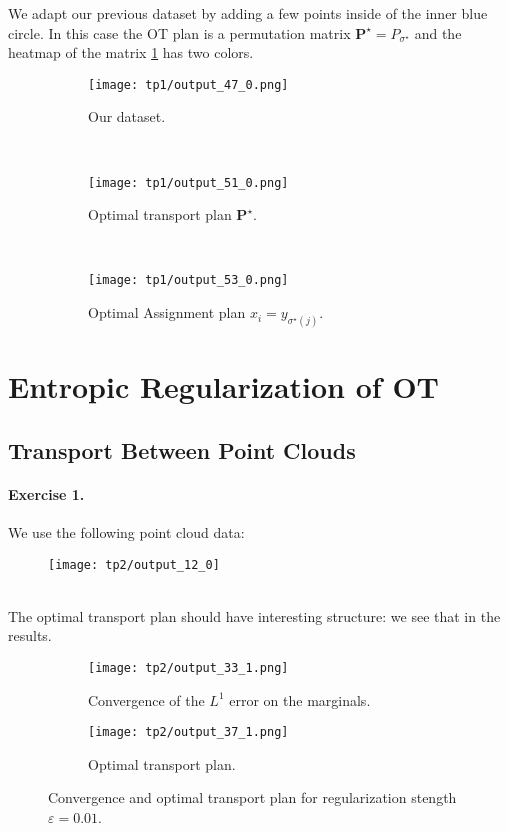 \documentclass{article}
\newcommand{\bfP}{\mathbf{P}}
\renewcommand{\epsilon}{\varepsilon}
\numberwithin{equation}{section}
\theoremstyle{definition}
\begin{document}
We adapt our previous dataset by adding a few points inside of the inner blue circle. In this case the OT plan is a permutation matrix $\bfP^\star = P_{\sigma^\star}$ and the heatmap of the matrix \cref{fig:output510} has two colors.
\begin{figure}[!h]
	\begin{subfigure}[t]{.33\linewidth}
		\texttt{[image: tp1/output\_47\_0.png]}
		\caption{Our dataset.}
	\end{subfigure}~
	\begin{subfigure}[t]{.33\linewidth}
		\texttt{[image: tp1/output\_51\_0.png]}
		\caption{Optimal transport plan $\bfP^\star$.}\label{fig:output510}
	\end{subfigure}~
	\begin{subfigure}[t]{.33\linewidth}
		\texttt{[image: tp1/output\_53\_0.png]}
		\caption{Optimal Assignment plan $x_i = y_{\sigma^\star(j)}$.}\label{fig:output530}
	\end{subfigure}
	\caption{}\label{fig:OptimalAssignment}
\end{figure}


\section{Entropic Regularization of OT}

\subsection{Transport Between Point Clouds}

\paragraph{Exercise 1.} We use the following point cloud data:
\begin{figure}[h!]
	\centering
	\texttt{[image: tp2/output\_12\_0]}
	\caption{}
	\label{fig:output120}
\end{figure}\\
The optimal transport plan should have interesting structure: we see that in the results.
\begin{figure}[!h]
	\centering
	\begin{subfigure}{.49\linewidth}
		\centering
		\texttt{[image: tp2/output\_33\_1.png]}\caption{Convergence of the $L^1$ error on the marginals.}
	\end{subfigure}
	\begin{subfigure}{.49\linewidth}
		\centering
		\texttt{[image: tp2/output\_37\_1.png]}\caption{Optimal transport plan.}
	\end{subfigure}
	\caption{Convergence and optimal transport plan for regularization stength $\epsilon = 0.01$.}
\end{figure}
\end{document}
